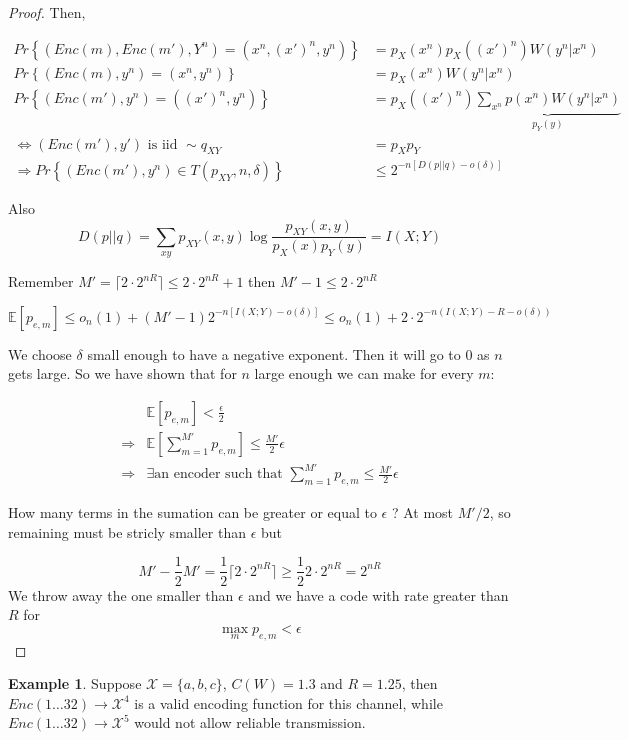 \documentclass[twoside]{article}
\theoremstyle{definition} %
\newtheorem{example}{Example}
\renewcommand{\Pr}[1]{Pr\left\{#1\right\}}
\newcommand{\Ex}[1]{\mathbb{E}\left[#1\right]}
\def\X{\mathcal{X}}
\begin{document}
\begin{proof}
Then,

\begin{align*}
  \Pr{(Enc(m), Enc(m'), Y^n) = (x^n, (x')^n, y^n)} &= p_X(x^n) p_X((x')^n)W(y^n|x^n)\\
  \Pr{(Enc(m), y^n) = (x^n, y^n)} &= p_X(x^n)W(y^n|x^n)\\
  \Pr{(Enc(m'), y^n) = ((x')^n, y^n)} &= p_X((x')^n) \underbrace{\sum_{x^n} p(x^n)W(y^n|x^n)}_{p_Y(y)}\\
  \iff (Enc(m'), y') \text{ is iid } \sim q_{XY} &= p_Xp_Y\\
  \Rightarrow \Pr{(Enc(m'), y^n) \in T(p_{XY}, n, \delta)} &\leq 2^{-n[D(p||q)- o(\delta)]}
\end{align*}

Also
\[
  D(p||q) = \sum_{xy} p_{XY}(x,y) \log \frac {p_{XY}(x,y)} {p_X(x) p_Y(y)} = I(X;Y)
\]


Remember $M' = \lceil2 \cdot 2^{nR} \rceil \leq 2 \cdot 2^{nR} + 1$ then $M'-1 \leq 2 \cdot 2^{nR}$

\[
  \Ex{p_{e,m}} \leq o_n(1) + (M' -1)  2^{-n[I(X;Y)- o(\delta)]}
  \leq o_n(1) + 2 \cdot 2^{-n(I(X;Y) - R - o(\delta))}
\]

We choose $\delta$ small enough to have a negative exponent. Then it will go to 0 as $n$ gets large. So we have shown that for $n $ large enough we can make for every $m$:

\begin{align*}
  &\Ex{p_{e,m}} < \frac \epsilon 2\\
  \Rightarrow& \Ex{\sum_{m=1}^{M'} p_{e,m}} \leq \frac{M'} 2 \epsilon\\
  \Rightarrow& \exists \text{an encoder such that } \sum_{m=1}^{M'} p_{e,m} \leq \frac{M'} 2 \epsilon
\end{align*}

How many terms in the sumation can be greater or equal to $\epsilon$ ? At most $M'/2$, so remaining must be stricly smaller than $\epsilon$ but

\[
  M' - \frac 1 2 M' = \frac 1 2 \lceil 2 \cdot 2^{nR} \rceil \geq \frac 1 2 2 \cdot 2^{nR} = 2^{nR}
\]
We throw away the one smaller than $\epsilon$ and we have a code with rate greater than $R$ for
\[
  \max_m p_{e,m} < \epsilon
\]
\end{proof}

\begin{example}
  Suppose $\X = \{a,b,c\}$, $C(W)=1.3$ and $R=1.25$, then $Enc(1 \dots 32) \to \X^4$ is a valid encoding function for this channel, while $Enc(1 \dots 32) \to \X^5$ would not allow reliable transmission.
\end{example}
\end{document}
